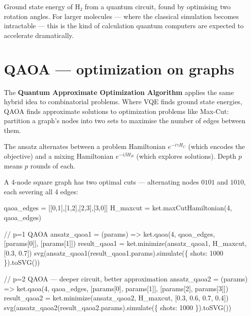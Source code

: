 \documentclass[
  11pt,
  letterpaper,
  oneside]{scrbook}
\newenvironment{Shaded}{\begin{snugshade}}{\end{snugshade}}
\newcommand{\NormalTok}[1]{\textcolor[rgb]{0.00,0.23,0.31}{#1}}
\begin{document}
Ground state energy of H₂ from a quantum circuit, found by optimising
two rotation angles. For larger molecules --- where the classical
simulation becomes intractable --- this is the kind of calculation
quantum computers are expected to accelerate dramatically.

\section{QAOA --- optimization on
graphs}\label{qaoa-optimization-on-graphs}

The \textbf{Quantum Approximate Optimization Algorithm} applies the same
hybrid idea to combinatorial problems. Where VQE finds ground state
energies, QAOA finds approximate solutions to optimization problems like
Max-Cut: partition a graph's nodes into two sets to maximise the number
of edges between them.

The ansatz alternates between a problem Hamiltonian \(e^{-i\gamma H_C}\)
(which encodes the objective) and a mixing Hamiltonian
\(e^{-i\beta H_B}\) (which explores solutions). Depth \(p\) means \(p\)
rounds of each.

A 4-node square graph has two optimal cuts --- alternating nodes
\(0101\) and \(1010\), each severing all 4 edges:

\begin{Shaded}
\begin{Highlighting}[]
\NormalTok{qaoa\_edges = [[0,1],[1,2],[2,3],[3,0]]}
\NormalTok{H\_maxcut = ket.maxCutHamiltonian(4, qaoa\_edges)}
\end{Highlighting}
\end{Shaded}

\begin{Shaded}
\begin{Highlighting}[]
\NormalTok{// p=1 QAOA}
\NormalTok{ansatz\_qaoa1 = (params) =\textgreater{} ket.qaoa(4, qaoa\_edges, [params[0]], [params[1]])}
\NormalTok{result\_qaoa1 = ket.minimize(ansatz\_qaoa1, H\_maxcut, [0.3, 0.7])}
\NormalTok{svg(ansatz\_qaoa1(result\_qaoa1.params).simulate(\{ shots: 1000 \}).toSVG())}
\end{Highlighting}
\end{Shaded}

\begin{Shaded}
\begin{Highlighting}[]
\NormalTok{// p=2 QAOA — deeper circuit, better approximation}
\NormalTok{ansatz\_qaoa2 = (params) =\textgreater{} ket.qaoa(4, qaoa\_edges, [params[0], params[1]], [params[2], params[3]])}
\NormalTok{result\_qaoa2 = ket.minimize(ansatz\_qaoa2, H\_maxcut, [0.3, 0.6, 0.7, 0.4])}
\NormalTok{svg(ansatz\_qaoa2(result\_qaoa2.params).simulate(\{ shots: 1000 \}).toSVG())}
\end{Highlighting}
\end{Shaded}
\end{document}

